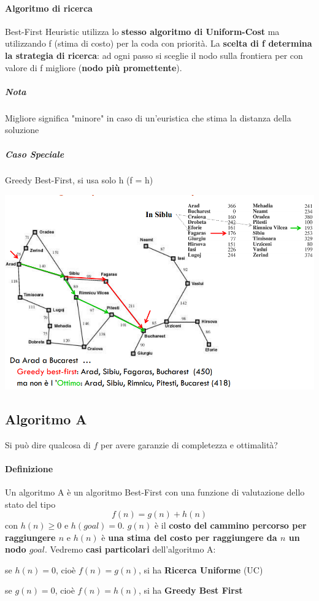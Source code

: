 \documentclass[10pt]{book}
\begin{document}
\paragraph{Algoritmo di ricerca} Best-First Heuristic utilizza lo \textbf{stesso algoritmo di Uniform-Cost} ma utilizzando f (stima di costo) per la coda con priorità. La \textbf{scelta di f determina la strategia di ricerca}: ad ogni passo si sceglie il nodo sulla frontiera per con valore di f migliore (\textbf{nodo più promettente}).
\subparagraph{Nota} Migliore significa "minore" in caso di un'euristica che stima la distanza della soluzione
\pagebreak
\subparagraph{Caso Speciale} Greedy Best-First, si usa solo h (f = h)
\begin{center}
	\includegraphics[scale=0.7]{greedybf.png}
\end{center}
\subsection{Algoritmo A}
Si può dire qualcosa di $f$ per avere garanzie di completezza e ottimalità?
\paragraph{Definizione} Un algoritmo A è un algoritmo Best-First con una funzione di valutazione dello stato del tipo $$f(n) = g(n) + h(n)$$ con $h(n) \geq 0$ e $h(goal) = 0$. $g(n)$ è il \textbf{costo del cammino percorso per raggiungere $n$} e $h(n)$ è \textbf{una stima del costo per raggiungere da $n$ un nodo $goal$}.
Vedremo \textbf{casi particolari} dell'algoritmo A:
\begin{list}{}{}
	\item se $h(n) = 0$, cioè $f(n) = g(n)$, si ha \textbf{Ricerca Uniforme} (UC)
	\item se $g(n) = 0$, cioè $f(n) = h(n)$, si ha \textbf{Greedy Best First}
\end{list}
\end{document}
